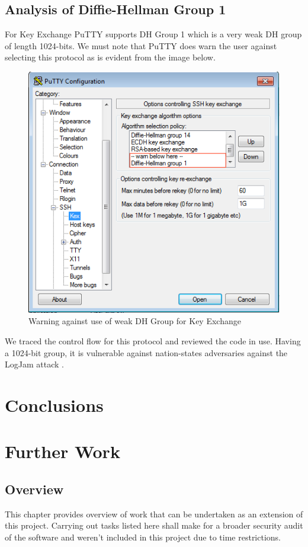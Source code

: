 \documentclass{report}
\begin{document}
\section{Analysis of Diffie-Hellman Group 1}
For Key Exchange PuTTY supports DH Group 1 which is a very weak DH group of length 1024-bits. We must note that PuTTY does warn the user against selecting this protocol as is evident from the image below.
\begin{figure}[ht]
\caption{Warning against use of weak DH Group for Key Exchange}
\centering
\includegraphics[width=1\textwidth]{legacy.png}
\end{figure}
We traced the control flow for this protocol and reviewed the code in use. Having a 1024-bit group, it is vulnerable against nation-states adversaries against the LogJam attack \cite{adrian}.
\chapter{Conclusions}
\chapter{Further Work}
\section{Overview}
This chapter provides overview of work that can be undertaken as an extension of this project. Carrying out tasks listed here shall make for a broader security audit of the software and weren't included in this project due to time restrictions.
\end{document}
